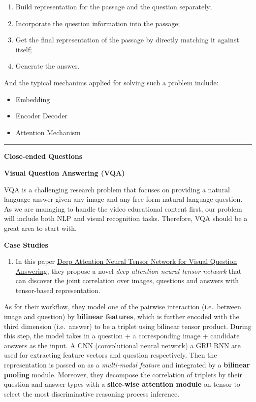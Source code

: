 \documentclass[]{book}
\providecommand{\tightlist}{%
  \setlength{\itemsep}{0pt}\setlength{\parskip}{0pt}}
\theoremstyle{definition}
\theoremstyle{definition}
\theoremstyle{definition}
\theoremstyle{remark}
\begin{document}
\begin{enumerate}
\def\labelenumi{\arabic{enumi}.}
\item
  Build representation for the passage and the question separately;
\item
  Incorporate the question information into the passage;
\item
  Get the final representation of the passage by directly matching it
  against itself;
\item
  Generate the answer.
\end{enumerate}

And the typical mechanims applied for solving such a problem include:

\begin{itemize}
\item
  Embedding
\item
  Encoder Decoder
\item
  Attention Mechanism
\end{itemize}

\begin{center}\rule{0.5\linewidth}{\linethickness}\end{center}

\textbf{Close-ended Questions}

\textbf{Visual Question Answering (VQA)}

VQA is a challenging research problem that focuses on providing a
natural language answer given any image and any free-form natural
language question. As we are managing to handle the video educational
content first, our problem will include both NLP and visual recognition
tasks. Therefore, VQA should be a great area to start with.

\textbf{Case Studies}

\begin{enumerate}
\def\labelenumi{\arabic{enumi}.}
\tightlist
\item
  In this paper
  \href{http://openaccess.thecvf.com/content_ECCV_2018/papers/Yalong_Bai_Deep_Attention_Neural_ECCV_2018_paper.pdf}{Deep
  Attention Neural Tensor Network for Visual Question Answering}, they
  propose a novel \emph{deep attention neural tensor network} that can
  discover the joint correlation over images, questions and answers with
  tensor-based representation.
\end{enumerate}

As for their workflow, they model one of the pairwise interaction
(i.e.~between image and question) by \textbf{bilinear features}, which
is further encoded with the third dimension (i.e.~answer) to be a
triplet using bilinear tensor product. During this step, the model takes
in a question + a corresponding image + candidate answers as the input.
A CNN (convolutional neural network) a GRU RNN are used for extracting
feature vectors and question respectively. Then the representation is
passed on as a \emph{multi-modal feature} and integrated by a
\textbf{bilinear pooling} module. Moreover, they decompose the
correlation of triplets by their question and answer types with a
\textbf{slice-wise attention module} on tensor to select the most
discriminative reasoning process inference.
\end{document}
